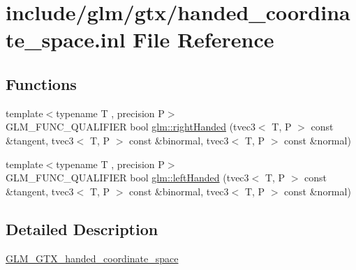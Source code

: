 \hypertarget{handed__coordinate__space_8inl}{}\section{include/glm/gtx/handed\+\_\+coordinate\+\_\+space.inl File Reference}
\label{handed__coordinate__space_8inl}
\subsection*{Functions}
\begin{DoxyCompactItemize}
\item 
{\footnotesize template$<$typename T , precision P$>$ }\\G\+L\+M\+\_\+\+F\+U\+N\+C\+\_\+\+Q\+U\+A\+L\+I\+F\+I\+ER bool \hyperlink{group__gtx__handed__coordinate__space_ga17cd83888de8755c0435c589fafd3603}{glm\+::right\+Handed} (tvec3$<$ T, P $>$ const \&tangent, tvec3$<$ T, P $>$ const \&binormal, tvec3$<$ T, P $>$ const \&normal)
\item 
{\footnotesize template$<$typename T , precision P$>$ }\\G\+L\+M\+\_\+\+F\+U\+N\+C\+\_\+\+Q\+U\+A\+L\+I\+F\+I\+ER bool \hyperlink{group__gtx__handed__coordinate__space_ga7425e0ebfe6a56919900a072ae1f8017}{glm\+::left\+Handed} (tvec3$<$ T, P $>$ const \&tangent, tvec3$<$ T, P $>$ const \&binormal, tvec3$<$ T, P $>$ const \&normal)
\end{DoxyCompactItemize}


\subsection{Detailed Description}
\hyperlink{group__gtx__handed__coordinate__space}{G\+L\+M\+\_\+\+G\+T\+X\+\_\+handed\+\_\+coordinate\+\_\+space} 